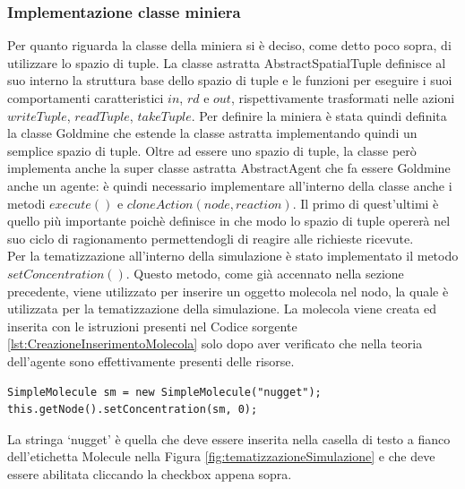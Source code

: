 \subsubsection{Implementazione classe miniera}
Per quanto riguarda la classe della miniera si è deciso, come detto poco sopra, di utilizzare lo spazio di tuple. La classe astratta AbstractSpatialTuple definisce al suo interno la struttura base dello spazio di tuple e le funzioni per eseguire i suoi comportamenti caratteristici $in$, $rd$ e $out$, rispettivamente trasformati nelle azioni $writeTuple$, $readTuple$, $takeTuple$.
Per definire la miniera è stata quindi definita la classe Goldmine che estende la classe astratta implementando quindi un semplice spazio di tuple.
Oltre ad essere uno spazio di tuple, la classe però implementa anche la super classe astratta AbstractAgent che fa essere Goldmine anche un agente: è quindi necessario implementare all'interno della classe anche i metodi $execute()$ e $cloneAction(node, reaction)$. Il primo di quest'ultimi è quello più importante poichè definisce in che modo lo spazio di tuple opererà nel suo ciclo di ragionamento permettendogli di reagire alle richieste ricevute.
\\
Per la tematizzazione all'interno della simulazione è stato implementato il metodo $setConcentration()$. Questo metodo, come già accennato nella sezione precedente, viene utilizzato per inserire un oggetto molecola nel nodo, la quale è utilizzata per la tematizzazione della simulazione. La molecola viene creata ed inserita con le istruzioni presenti nel Codice sorgente \ref{lst:CreazioneInserimentoMolecola} solo dopo aver verificato che nella teoria dell'agente sono effettivamente presenti delle risorse.
\medskip
\begin{lstlisting}[firstnumber=1,label={lst:CreazioneInserimentoMolecola},caption={Creazione e inserimento molecola}]
SimpleMolecule sm = new SimpleMolecule("nugget");
this.getNode().setConcentration(sm, 0);
\end{lstlisting}
La stringa `nugget' è quella che deve essere inserita nella casella di testo a fianco dell'etichetta Molecule nella Figura \ref{fig:tematizzazioneSimulazione} e che deve essere abilitata cliccando la checkbox appena sopra.
\newline

